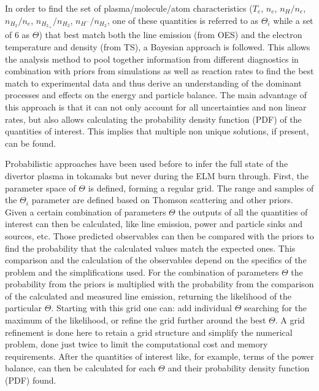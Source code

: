 In order to find the set of plasma/molecule/atom characteristics ($T_e$, $n_e$, $n_{H}/n_e$, $n_{H_2}/n_e$, $n_{{H_2}_+}/n_{H_2}$, $n_{{H}^-}/n_{H_2}$, one of these quantities is referred to as $\Theta_i$ while a set of 6 as $\Theta$) that best match both the line emission (from OES) and the electron temperature and density (from TS), a Bayesian approach is followed. This allows the analysis method to pool together information from different diagnostics in combination with priors from simulations as well as reaction rates to find the best match to experimental data and thus derive an understanding of the dominant processes and effects on the energy and particle balance. The main advantage of this approach is that it can not only account for all uncertainties and non linear rates, but also allows calculating the probability density function (PDF) of the quantities of interest. This implies that multiple non unique solutions, if present, can be found.

Probabilistic approaches have been used before to infer the full state of the divertor plasma in tokamaks but never during the ELM burn through.\cite{Verhaegh2017,Verhaegh2020,Bowman2020} First, the parameter space of $\Theta$  is defined, forming a regular grid. The range and samples of the $\Theta_i$ parameter are defined based on Thomson scattering and other priors. Given a certain combination of parameters $\Theta$ the outputs of all the quantities of interest can then be calculated, like line emission, power and particle sinks and sources, etc. Those predicted observables can then be compared with the priors to find the probability that the calculated values match the expected ones. This comparison and the calculation of the observables depend on the specifics of the problem and the simplifications used. For the combination of parameters $\Theta$ the probability from the priors is multiplied with the probability from the comparison of the calculated and measured line emission, returning the likelihood of the particular $\Theta$. Starting with this grid one can: add individual $\Theta$ searching for the maximum of the likelihood, or refine the grid further around the best $\Theta$. A grid refinement is done here to retain a grid structure and simplify the numerical problem, done just twice to limit the computational cost and memory requirements. After the quantities of interest like, for example, terms of the power balance, can then be calculated for each $\Theta$ and their probability density function (PDF) found.


